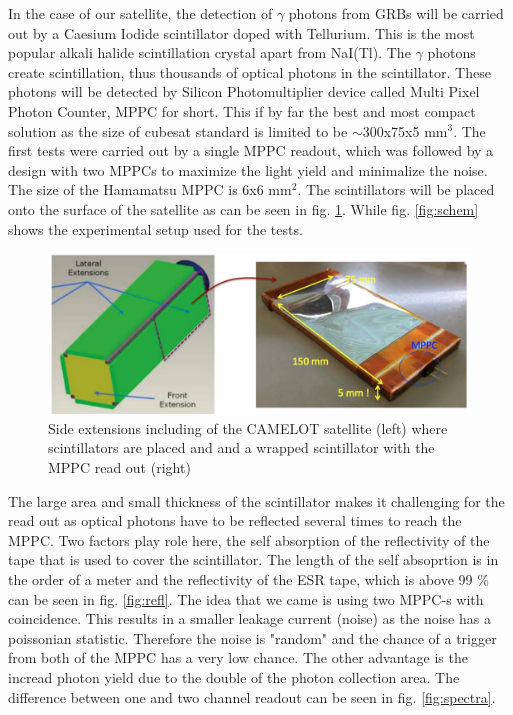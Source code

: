 \documentclass[12pt, a4paper,titlepage]{article}
\numberwithin{equation}{section}
\numberwithin{figure}{section}
\begin{document}
In the case of our satellite, the detection of $\gamma$ photons from GRBs will be carried out by a Caesium Iodide scintillator doped with Tellurium. This is the most popular alkali halide scintillation crystal apart from NaI(Tl). The $\gamma$ photons create scintillation, thus thousands of optical photons in the scintillator. These photons will be detected by Silicon Photomultiplier device called Multi Pixel Photon Counter, MPPC for short. This if by far the best and most compact solution as the size of cubesat standard is limited to be $\sim$300x75x5 mm$^{3}$. The first tests were carried out by a single MPPC readout, which was followed by a design with two MPPCs to maximize the light yield and minimalize the noise. The size of the Hamamatsu MPPC is 6x6 mm$^{2}$. The scintillators will be placed onto the surface of the satellite as can be seen in fig. \ref{fig:scints}. While fig. \ref{fig:schem} shows the experimental setup used for the tests.

\begin{figure}[H]
\centering
\includegraphics[width=130.0mm]{images/scint_on_sate.png}
\caption{Side extensions including of the CAMELOT satellite (left) where scintillators are placed and and a wrapped scintillator with the MPPC read out (right)}
\label{fig:scints}
\end{figure}

The large area and small thickness of the scintillator makes it challenging for the read out as optical photons have to be reflected several times to reach the MPPC. Two factors play role here, the self absorption of the reflectivity of the tape that is used to cover the scintillator. The length of the self absoprtion is in the order of a meter and the reflectivity of the ESR tape, which is above 99 \% can be seen in fig. \ref{fig:refl}. The idea that we came is using two MPPC-s with coincidence. This results in a smaller leakage current (noise) as the noise has a poissonian statistic. Therefore the noise is "random" and the chance of a trigger from both of the MPPC has a very low chance. The other advantage is the incread photon yield due to the double of the photon collection area. The difference between one and two channel readout can be seen in fig. \ref{fig:spectra}.
\end{document}
